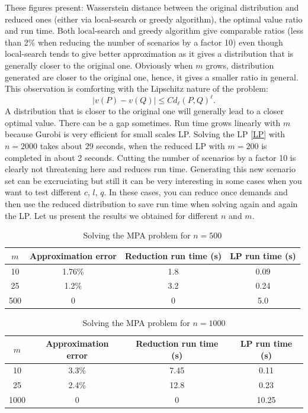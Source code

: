 \documentclass{amsart}
\begin{document}
These figures present: Wasserstein distance between the original distribution and reduced ones (either via local-search or greedy algorithm), the optimal value ratio and run time. Both local-search and greedy algorithm give comparable ratios (less than 2\% when reducing the number of scenarios by a factor 10) even though local-search tends to give better approximation as it gives a distribution that is generally closer to the original one. Obviously when $m$ grows, distribution generated are closer to the original one, hence, it gives a smaller ratio in general. This observation is comforting with the Lipschitz nature of the problem: $$\lvert v\left(P\right)-v\left(Q\right)\rvert \leq C d_\ell\left(P,Q\right)^\ell.$$ A distribution that is closer to the original one will generally lead to a closer optimal value. There can be a gap sometimes. Run time grows linearly with $m$ because Gurobi is very efficient for small scales LP. Solving the LP \ref{LP} with $n=2000$ takes about 29 seconds, when the reduced LP with $m=200$ is completed in about 2 seconds. Cutting the number of scenarios by a factor 10 is clearly not threatening here and reduces run time. Generating this new scenario set can be excruciating but still it can be very interesting in some cases when you want to test different $c$, $l$, $q$. In these cases, you can reduce once demands and then use the reduced distribution to save run time when solving again and again the LP. Let us present the results we obtained for different $n$ and $m$. 
\clearpage
\begin{table}[!h]
    \centering
    \begin{tabular}{|c|c|c|c|}
        \hline
        $m$& Approximation error & Reduction run time (s)& LP run time (s) \\
        \hline
        10 & 1.76\% & 1.8 & 0.09\\
        \hline
        25& 1.2\% & 3.2 &0.24\\
        \hline
        500 & 0 & 0& 5.0\\
        \hline

    \end{tabular}
    \caption{Solving the MPA problem for $n=500$}\label{tabular1}
\end{table}

\begin{table}[!h]
    \centering
    \begin{tabular}{|c|c|c|c|}
        \hline
        $m$& Approximation error & Reduction run time (s)& LP run time (s) \\
        \hline
        10 & 3.3\% &7.45 &0.11\\
        \hline
        25& 2.4\% & 12.8 &0.23\\
        \hline
        1000 & 0 & 0& 10.25\\
        \hline

    \end{tabular}
    \caption{Solving the MPA problem for $n=1000$}\label{tabular2}
\end{table}
\end{document}
